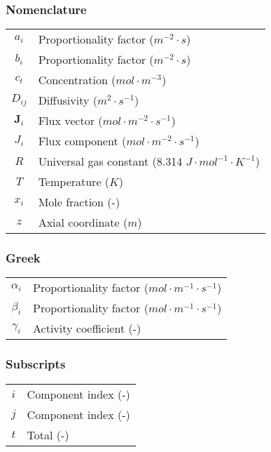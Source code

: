 \documentclass[twocolumn]{article}
\begin{document}
\subsubsection*{Nomenclature}
\begin{table}[H]
    \begin{tabular}{c l}  
      $a_i$ & Proportionality factor ($ m^{-2} \cdot s $) \\     
      $b_i$ & Proportionality factor ($ m^{-2} \cdot s $) \\     
      $c_t$ & Concentration ($mol \cdot m^{-3}$) \\
      $D_{ij}$ & Diffusivity ($m^2 \cdot s^{-1}$) \\
      $\textbf{J}_i$ & Flux vector ($mol \cdot m^{-2} \cdot s^{-1}$) \\
      $J_i$ & Flux component ($mol \cdot m^{-2} \cdot s^{-1}$) \\   
      $R$ & Universal gas constant (8.314 $J \cdot mol^{-1} \cdot K^{-1}$) \\  
      $T$ & Temperature ($K$) \\       
      $x_i$ & Mole fraction (-)\\
      $z$ & Axial coordinate ($m$) \\
    \end{tabular}
\end{table}
\subsubsection*{Greek}
\begin{table}[H]
    \begin{tabular}{c l} 
      $\alpha_i$ & Proportionality factor ($mol \cdot m^{-1} \cdot s^{-1}$) \\
      $\beta_i$ & Proportionality factor ($mol \cdot m^{-1} \cdot s^{-1}$) \\
      $\gamma_i$ & Activity coefficient (-) \\
    \end{tabular}
\end{table}
\subsubsection*{Subscripts}
\begin{table}[H]
    \begin{tabular}{c l} 
      $i$ & Component index (-)\\
      $j$ & Component index (-) \\
      $t$ & Total (-) \\
    \end{tabular}
\end{table}
\end{document}
